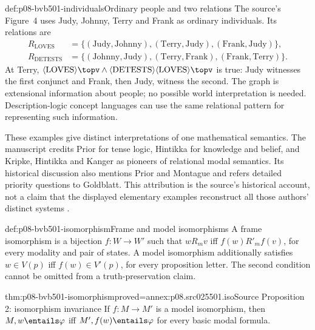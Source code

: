 \begin{hbexample}{def:p08-bvb501-individuals}{Ordinary people and two relations}
The source's Figure~4 uses Judy, Johnny, Terry and Frank as ordinary
individuals. Its relations are
\[
\begin{aligned}
 R_{\mathrm{LOVES}}&=\{(\mathrm{Judy},\mathrm{Johnny}),
   (\mathrm{Terry},\mathrm{Judy}),(\mathrm{Frank},\mathrm{Judy})\},\\
 R_{\mathrm{DETESTS}}&=\{(\mathrm{Johnny},\mathrm{Judy}),
   (\mathrm{Terry},\mathrm{Frank}),(\mathrm{Frank},\mathrm{Terry})\}.
\end{aligned}
\]
At Terry, \(\langle\mathrm{LOVES}\rangle\topv\land
\langle\mathrm{DETESTS}\rangle\langle\mathrm{LOVES}\rangle\topv\)
is true: Judy witnesses the first conjunct and Frank, then Judy, witness
the second. The graph is extensional information about people; no possible
world interpretation is needed. Description-logic concept languages can use
the same relational pattern for representing such information.
\end{hbexample}

These examples give distinct interpretations of one mathematical semantics.
The manuscript credits Prior for tense logic, Hintikka for knowledge and
belief, and Kripke, Hintikka and Kanger as pioneers of relational modal
semantics. Its historical discussion also mentions Prior and Montague and
refers detailed priority questions to Goldblatt. This attribution is the
source's historical account, not a claim that the displayed elementary
examples reconstruct all those authors' distinct systems
\cite[pp.~5--9]{BlackburnVanBenthem2006ILLC}.

\begin{hbdefinition}{def:p08-bvb501-isomorphism}{Frame and model isomorphisms}
A frame isomorphism is a bijection \(f:W\to W'\) such that
\(wR_mv\) iff \(f(w)R'_mf(v)\), for every modality and pair of states.
A model isomorphism additionally satisfies
\(w\in V(p)\) iff \(f(w)\in V'(p)\), for every proposition letter.
The second condition cannot be omitted from a truth-preservation claim.
\end{hbdefinition}

\begin{hbtheorem}{thm:p08-bvb501-isomorphism}{proved=annex:p08.src025501.iso}{Source Proposition 2: isomorphism invariance}
If \(f:M\to M'\) is a model isomorphism, then
\(M,w\entails\varphi\) iff \(M',f(w)\entails\varphi\)
for every basic modal formula.
\end{hbtheorem}

